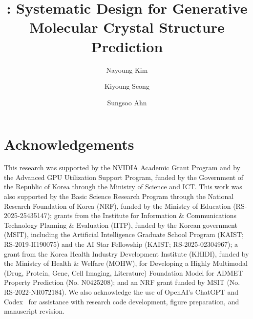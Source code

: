 \documentclass{spml_template}
\title{\model{}: Systematic Design for Generative Molecular Crystal Structure Prediction}
\author[1]{Nayoung Kim}
\author[1]{Kiyoung Seong}
\author[1]{Sungsoo Ahn}
\affiliation[1]{Korea Advanced Institute of Science and Technology (KAIST)}
\begin{document}
\maketitle











\section*{Acknowledgements}
This research was supported by the NVIDIA Academic Grant Program and by the
Advanced GPU Utilization Support Program, funded by the Government of the
Republic of Korea through the Ministry of Science and ICT. This work was also
supported by the Basic Science Research Program through the National Research
Foundation of Korea (NRF), funded by the Ministry of Education
(RS-2025-25435147); grants from the Institute for Information \& Communications
Technology Planning \& Evaluation (IITP), funded by the Korean government
(MSIT), including the Artificial Intelligence Graduate School Program (KAIST;
RS-2019-II190075) and the AI Star Fellowship (KAIST; RS-2025-02304967); a grant
from the Korea Health Industry Development Institute (KHIDI), funded by the
Ministry of Health \& Welfare (MOHW), for Developing a Highly Multimodal (Drug,
Protein, Gene, Cell Imaging, Literature) Foundation Model for ADMET Property
Prediction (No. N0425208); and an NRF grant funded by MSIT
(No. RS-2022-NR072184). We also acknowledge the use of OpenAI's ChatGPT and Codex~\citep{openai_chatgpt,openai_codex} for assistance with research code development, figure preparation, and manuscript revision.


\clearpage





\appendix
\clearpage

\clearpage

\clearpage

\clearpage

\clearpage

\clearpage

\clearpage

\clearpage

\clearpage

\clearpage


\end{document}
